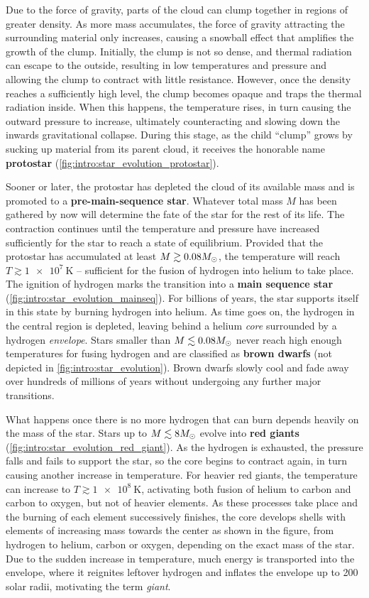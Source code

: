 Due to the force of gravity, parts of the cloud can clump together in regions of greater density.
As more mass accumulates, the force of gravity attracting the surrounding material only increases, causing a snowball effect that amplifies the growth of the clump.
Initially, the clump is not so dense, and thermal radiation can escape to the outside, resulting in low temperatures and pressure and allowing the clump to contract with little resistance.
However, once the density reaches a sufficiently high level, the clump becomes opaque and traps the thermal radiation inside.
When this happens, the temperature rises, in turn causing the outward pressure to increase, ultimately counteracting and slowing down the inwards gravitational collapse.
During this stage, as the child ``clump'' grows by sucking up material from its parent cloud, it receives the honorable name \textbf{protostar} (\cref{fig:intro:star_evolution_protostar}).

Sooner or later, the protostar has depleted the cloud of its available mass and is promoted to a \textbf{pre-main-sequence star}.
Whatever total mass $M$ has been gathered by now will determine the fate of the star for the rest of its life.
The contraction continues until the temperature and pressure have increased sufficiently for the star to reach a state of equilibrium.
Provided that the protostar has accumulated at least $M \gtrsim 0.08 M_\odot$, the temperature will reach $T \gtrsim \SI{1e7}{\kelvin}$ -- sufficient for the fusion of hydrogen into helium to take place.
The ignition of hydrogen marks the transition into a \textbf{main sequence star} (\cref{fig:intro:star_evolution_mainseq}).
For billions of years, the star supports itself in this state by burning hydrogen into helium.
As time goes on, the hydrogen in the central region is depleted, leaving behind a helium \emph{core} surrounded by a hydrogen \emph{envelope}.
Stars smaller than $M \lesssim 0.08 M_\odot$ never reach high enough temperatures for fusing hydrogen and are classified as \textbf{brown dwarfs} (not depicted in \cref{fig:intro:star_evolution}).
Brown dwarfs slowly cool and fade away over hundreds of millions of years without undergoing any further major transitions.

What happens once there is no more hydrogen that can burn depends heavily on the mass of the star.
Stars up to $M \lesssim 8 M_\odot$ evolve into \textbf{red giants} (\cref{fig:intro:star_evolution_red_giant}).
As the hydrogen is exhausted, the pressure falls and fails to support the star, so the core begins to contract again, in turn causing another increase in temperature.
For heavier red giants, the temperature can increase to $T \gtrsim \SI{1e8}{\kelvin}$, activating both fusion of helium to carbon and carbon to oxygen, but not of heavier elements.
As these processes take place and the burning of each element successively finishes, the core develops shells with elements of increasing mass towards the center as shown in the figure, from hydrogen to helium, carbon or oxygen, depending on the exact mass of the star.
Due to the sudden increase in temperature, much energy is transported into the envelope, where it reignites leftover hydrogen and inflates the envelope up to 200 solar radii, motivating the term \emph{giant}.


